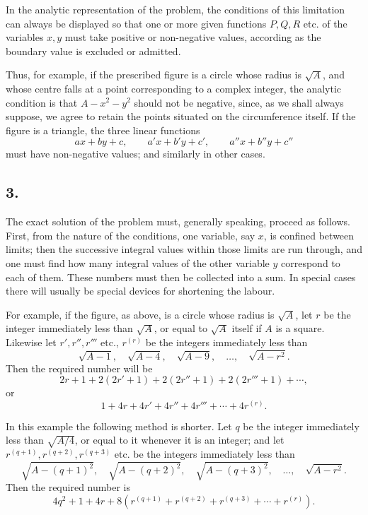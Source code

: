 \documentclass[12pt]{article}
\begin{document}
In the analytic representation of the problem, the conditions of this limitation can always be displayed so that one or more given functions $P,Q,R$ etc. of the variables $x,y$ must take positive or non-negative values, according as the boundary value is excluded or admitted.

Thus, for example, if the prescribed figure is a circle whose radius is $\sqrt A$, and whose centre falls at a point corresponding to a complex integer, the analytic condition is that $A-x^2-y^2$ should not be negative, since, as we shall always suppose, we agree to retain the points situated on the circumference itself. If the figure is a triangle, the three linear functions
\[
ax+by+c,\qquad a'x+b'y+c',\qquad a''x+b''y+c''
\]
must have non-negative values; and similarly in other cases.

\subsection*{3.}

The exact solution of the problem must, generally speaking, proceed as follows. First, from the nature of the conditions, one variable, say $x$, is confined between limits; then the successive integral values within those limits are run through, and one must find how many integral values of the other variable $y$ correspond to each of them. These numbers must then be collected into a sum. In special cases there will usually be special devices for shortening the labour.

For example, if the figure, as above, is a circle whose radius is $\sqrt A$, let $r$ be the integer immediately less than $\sqrt A$, or equal to $\sqrt A$ itself if $A$ is a square. Likewise let $r',r'',r'''$ etc., $r^{(r)}$ be the integers immediately less than
\[
\sqrt{A-1},\quad \sqrt{A-4},\quad \sqrt{A-9},\quad \ldots,\quad \sqrt{A-r^2}.
\]
Then the required number will be
\[
2r+1+2(2r'+1)+2(2r''+1)+2(2r'''+1)+\cdots,
\]
or
\[
1+4r+4r'+4r''+4r'''+\cdots+4r^{(r)}.
\]

In this example the following method is shorter. Let $q$ be the integer immediately less than $\sqrt{A/4}$, or equal to it whenever it is an integer; and let $r^{(q+1)},r^{(q+2)},r^{(q+3)}$ etc. be the integers immediately less than
\[
\sqrt{A-(q+1)^2},\quad \sqrt{A-(q+2)^2},\quad \sqrt{A-(q+3)^2},\quad\ldots,\quad \sqrt{A-r^2}.
\]
Then the required number is
\[
4q^2+1+4r+8\left(r^{(q+1)}+r^{(q+2)}+r^{(q+3)}+\cdots+r^{(r)}\right).
\]
\end{document}
